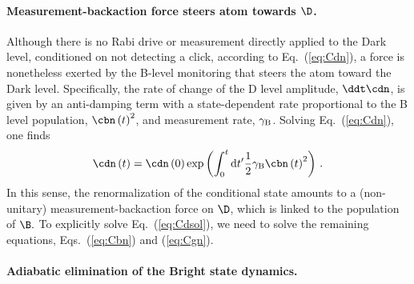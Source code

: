 \paragraph{Measurement-backaction  force steers atom towards $\D$. }

Although there is no Rabi drive or measurement directly applied to
the Dark level, conditioned on not detecting a click, according to
Eq.~(\ref{eq:Cdn}), a force is nonetheless exerted by the B-level
monitoring that steers the atom toward the Dark level. Specifically,
the rate of change of the D level amplitude, $\ddt\cdn$, is given
by an anti-damping term with a state-dependent rate proportional to
the B level population, $\cbn\left(t\right)^{2}$, and measurement
rate, $\gamma_{{\rm B}}$. Solving Eq.~(\ref{eq:Cdn}), one finds
\begin{equation}
\cdn\left(t\right)=\cdn\left(0\right)\exp\left(\int_{0}^{t}\mathrm{d}t'\frac{1}{2}\gamma_{{\rm B}}\cbn\left(t\right)^{2}\right)\,.\label{eq:Cdsol}
\end{equation}
In this sense, the renormalization of the conditional state amounts
to a (non-unitary) measurement-backaction force on $\D$, which is
linked to the population of $\B.$ To explicitly solve Eq.~(\ref{eq:Cdsol}),
we need to solve the remaining equations, Eqs.~(\ref{eq:Cbn}) and
(\ref{eq:Cgn}). 

\paragraph{Adiabatic elimination of the Bright state dynamics.}

